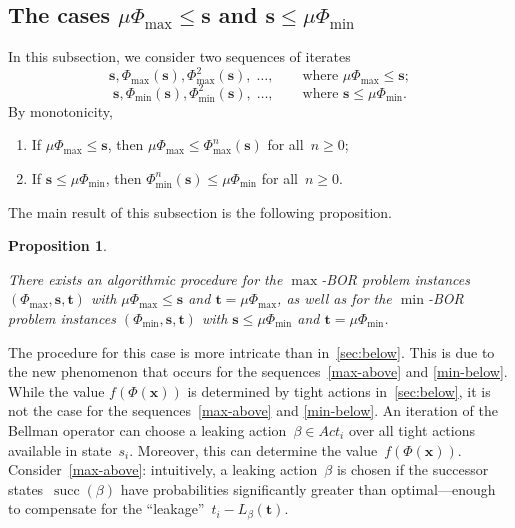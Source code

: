 \documentclass[preprint,12pt]{elsarticle}
\theoremstyle{plain}
\newtheorem{proposition}[theorem]{Proposition}
\theoremstyle{definition}
\theoremstyle{remark}
\theoremstyle{claimstyle}
\DeclareMathOperator*{\suc}{succ}
\begin{document}
\subsection{The cases $\mu\Phi_{\max} \leq \bm{s}$ and $\bm{s} \leq \mu\Phi_{\min}$} \label{sec:above}

In this subsection, we consider two sequences of iterates
\begin{equation}
	\label{max-above}
		\bm{s}, \Phi_{\max}(\bm{s}), \Phi^2_{\max}(\bm{s}), \; \dots, \qquad
	\text{where } \mu\Phi_{\max} \leq \bm{s};
\end{equation}
\begin{equation}
	\label{min-below}
		\bm{s}, \Phi_{\min}(\bm{s}), \Phi^2_{\min}(\bm{s}), \; \dots, \qquad 
	\text{where } \bm{s} \leq \mu\Phi_{\min}.
\end{equation}
By monotonicity,
\begin{enumerate}
	\item If $\mu\Phi_{\max} \leq \bm{s}$, then $\mu\Phi_{\max} \leq \Phi^n_{\max}(\bm{s})$ for all~$n \geq 0$;
	\item If $\bm{s} \leq \mu\Phi_{\min}$, then $\Phi^n_{\min}(\bm{s}) \leq \mu\Phi_{\min}$ for all~$n \geq 0$.
\end{enumerate}

The main result of this subsection is the following proposition.
\begin{proposition}
\label{above-decid}

There exists an algorithmic procedure for the $\max$-BOR problem instances $(\Phi_{\max}, \bm{s}, \bm{t})$ with $ \mu\Phi_{\max} \leq \bm{s}$ and $\bm{t} = \mu\Phi_{\max}$,
as well as for the $\min$-BOR problem instances
$(\Phi_{\min}, \bm{s}, \bm{t})$ with $\bm{s} \leq \mu\Phi_{\min}$ and $\bm{t} = \mu\Phi_{\min}$.
\end{proposition}
The procedure for this case is more intricate than in~\cref{sec:below}.
This is due to the new phenomenon that occurs for the sequences~\eqref{max-above} and \eqref{min-below}.
While the value $f(\Phi(\bm{x}))$ is determined by tight actions in~\cref{sec:below}, it is not the case for the sequences~\eqref{max-above} and \eqref{min-below}. 
An iteration of the Bellman operator can choose a leaking action~$\beta \in Act_i$ over all tight actions available in state~$s_i$. 
Moreover, this can determine the value~$f(\Phi(\bm{x}))$. 
Consider~\eqref{max-above}: 
intuitively, a leaking action~$\beta$ is chosen if the successor states~$\suc(\beta)$ have probabilities significantly greater than optimal---enough to compensate for the ``leakage''~$t_i - L_\beta(\bm{t})$.
\end{document}
